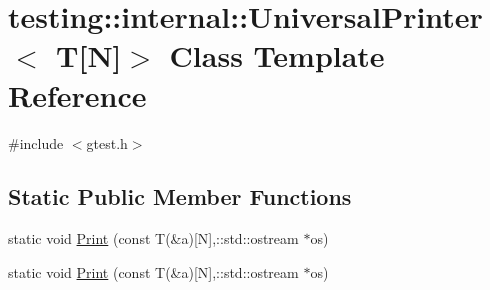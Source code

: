 \hypertarget{classtesting_1_1internal_1_1_universal_printer_3_01_t[_n]_4}{\section{testing\-:\-:internal\-:\-:Universal\-Printer$<$ T\mbox{[}N\mbox{]}$>$ Class Template Reference}
\label{classtesting_1_1internal_1_1_universal_printer_3_01_t[_n]_4}
}


{\ttfamily \#include $<$gtest.\-h$>$}

\subsection*{Static Public Member Functions}
\begin{DoxyCompactItemize}
\item 
static void \hyperlink{classtesting_1_1internal_1_1_universal_printer_3_01_t[_n]_4_a47e8cb5abce40735db381910513a4721}{Print} (const T(\&a)\mbox{[}N\mbox{]},\-::std\-::ostream $\ast$os)
\item 
static void \hyperlink{classtesting_1_1internal_1_1_universal_printer_3_01_t[_n]_4_a47e8cb5abce40735db381910513a4721}{Print} (const T(\&a)\mbox{[}N\mbox{]},\-::std\-::ostream $\ast$os)
\end{DoxyCompactItemize}


